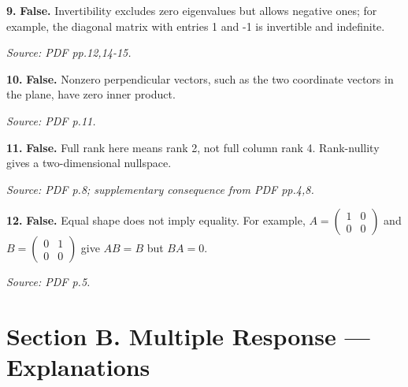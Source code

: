 \documentclass[11pt,a4paper]{article}
\begin{document}
\par\noindent\begin{minipage}{\linewidth}
\textbf{9.} \textbf{False.} Invertibility excludes zero eigenvalues but allows negative ones; for example, the diagonal matrix with entries 1 and -1 is invertible and indefinite.

{\footnotesize\textit{Source: PDF pp.12,14-15.}}
\end{minipage}\par\vspace{3mm}
\par\noindent\begin{minipage}{\linewidth}
\textbf{10.} \textbf{False.} Nonzero perpendicular vectors, such as the two coordinate vectors in the plane, have zero inner product.

{\footnotesize\textit{Source: PDF p.11.}}
\end{minipage}\par\vspace{3mm}
\par\noindent\begin{minipage}{\linewidth}
\textbf{11.} \textbf{False.} Full rank here means rank 2, not full column rank 4. Rank-nullity gives a two-dimensional nullspace.

{\footnotesize\textit{Source: PDF p.8; supplementary consequence from PDF pp.4,8.}}
\end{minipage}\par\vspace{3mm}
\par\noindent\begin{minipage}{\linewidth}
\textbf{12.} \textbf{False.} Equal shape does not imply equality. For example, \(A=\begin{pmatrix}1&0\\0&0\end{pmatrix}\) and \(B=\begin{pmatrix}0&1\\0&0\end{pmatrix}\) give \(AB=B\) but \(BA=0\).

{\footnotesize\textit{Source: PDF p.5.}}
\end{minipage}\par\vspace{3mm}
\newpage\section*{Section B. Multiple Response --- Explanations}
\end{document}
